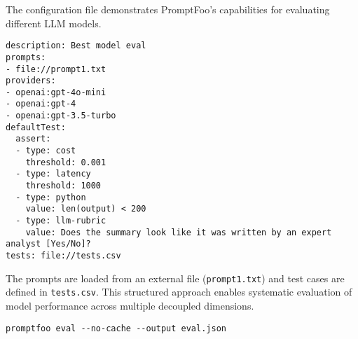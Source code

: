 The configuration file demonstrates PromptFoo's capabilities for evaluating different LLM models.~
\begin{verbatim}
description: Best model eval
prompts:
- file://prompt1.txt
providers:
- openai:gpt-4o-mini
- openai:gpt-4
- openai:gpt-3.5-turbo
defaultTest:
  assert:
  - type: cost
    threshold: 0.001
  - type: latency
    threshold: 1000
  - type: python
    value: len(output) < 200
  - type: llm-rubric
    value: Does the summary look like it was written by an expert analyst [Yes/No]?
tests: file://tests.csv
\end{verbatim}


The prompts are loaded from an external file (\texttt{prompt1.txt}) and test cases are defined in \texttt{tests.csv}. This structured approach enables systematic evaluation of model performance across multiple decoupled dimensions.

\begin{verbatim}
promptfoo eval --no-cache --output eval.json
\end{verbatim}

